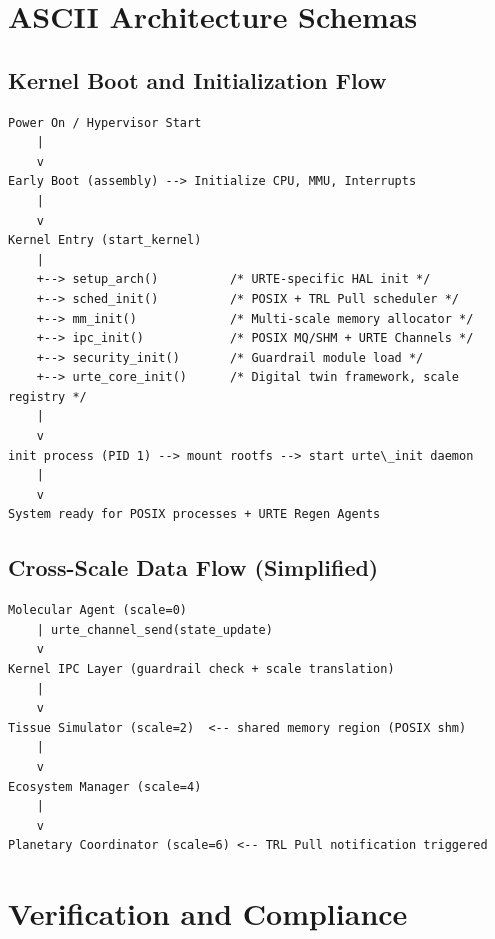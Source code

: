 \documentclass[11pt,a4paper]{report}
\begin{document}
\chapter{ASCII Architecture Schemas}

\section{Kernel Boot and Initialization Flow}

\begin{lstlisting}[style=kernelschema, caption={URTE Kernel Boot Sequence}]
Power On / Hypervisor Start
    |
    v
Early Boot (assembly) --> Initialize CPU, MMU, Interrupts
    |
    v
Kernel Entry (start_kernel)
    |
    +--> setup_arch()          /* URTE-specific HAL init */
    +--> sched_init()          /* POSIX + TRL Pull scheduler */
    +--> mm_init()             /* Multi-scale memory allocator */
    +--> ipc_init()            /* POSIX MQ/SHM + URTE Channels */
    +--> security_init()       /* Guardrail module load */
    +--> urte_core_init()      /* Digital twin framework, scale registry */
    |
    v
init process (PID 1) --> mount rootfs --> start urte\_init daemon
    |
    v
System ready for POSIX processes + URTE Regen Agents
\end{lstlisting}

\section{Cross-Scale Data Flow (Simplified)}

\begin{lstlisting}[style=kernelschema, caption={Cross-Scale IPC via Kernel}]
Molecular Agent (scale=0)
    | urte_channel_send(state_update)
    v
Kernel IPC Layer (guardrail check + scale translation)
    | 
    v
Tissue Simulator (scale=2)  <-- shared memory region (POSIX shm)
    |
    v
Ecosystem Manager (scale=4)
    |
    v
Planetary Coordinator (scale=6) <-- TRL Pull notification triggered
\end{lstlisting}

\chapter{Verification and Compliance}
\end{document}
